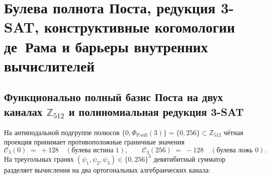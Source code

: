 \chapter{Булева полнота Поста, редукция 3-SAT, конструктивные когомологии де~Рама и барьеры внутренних вычислителей}
\label{ch:mono-logic-cohomology-barriers}

\section{Функционально полный базис Поста на двух каналах \texorpdfstring{$\mathbb{Z}_{512}$}{Z512} и полиномиальная редукция 3-SAT}

На антиподальной подгруппе полюсов $\{0, \Phi_{\mathrm{Pauli}}(3)\} = \{0, 256\} \subset \mathbb{Z}_{512}$ чётная проекция принимает противоположные граничные значения
\begin{equation}
  \label{eq:mono-boolean-poles}
  \mathcal{C}_3(0) \;=\; +128 \quad (\text{булева истина } 1), \qquad
  \mathcal{C}_3(256) \;=\; -128 \quad (\text{булева ложь } 0).
\end{equation}
На треугольных гранях $(\psi_1, \psi_2, \psi_3) \in \{0, 256\}^3$ девятибитный сумматор разделяет вычисления на два ортогональных алгебраических канала:
